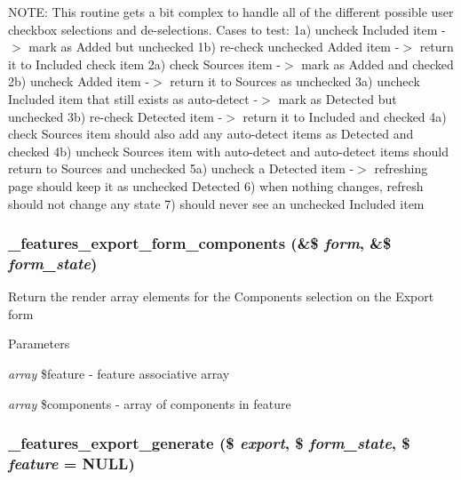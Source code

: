 NOTE: This routine gets a bit complex to handle all of the different possible user checkbox selections and de-\/selections. Cases to test: 1a) uncheck Included item -\/$>$ mark as Added but unchecked 1b) re-\/check unchecked Added item -\/$>$ return it to Included check item 2a) check Sources item -\/$>$ mark as Added and checked 2b) uncheck Added item -\/$>$ return it to Sources as unchecked 3a) uncheck Included item that still exists as auto-\/detect -\/$>$ mark as Detected but unchecked 3b) re-\/check Detected item -\/$>$ return it to Included and checked 4a) check Sources item should also add any auto-\/detect items as Detected and checked 4b) uncheck Sources item with auto-\/detect and auto-\/detect items should return to Sources and unchecked 5a) uncheck a Detected item -\/$>$ refreshing page should keep it as unchecked Detected 6) when nothing changes, refresh should not change any state 7) should never see an unchecked Included item \hypertarget{features_8admin_8inc_a1ac3eccd6829e3c5388179a22bdb9817}{
\subsubsection[{\_\-features\_\-export\_\-form\_\-components}]{\setlength{\rightskip}{0pt plus 5cm}\_\-features\_\-export\_\-form\_\-components (\&\$ {\em form}, \/  \&\$ {\em form\_\-state})}}
\label{features_8admin_8inc_a1ac3eccd6829e3c5388179a22bdb9817}
Return the render array elements for the Components selection on the Export form 
\begin{DoxyParams}{Parameters}
\item[{\em array}]\$feature -\/ feature associative array \item[{\em array}]\$components -\/ array of components in feature \end{DoxyParams}
\hypertarget{features_8admin_8inc_aa105fdb0198373e24dfbe6ae4d096412}{
\subsubsection[{\_\-features\_\-export\_\-generate}]{\setlength{\rightskip}{0pt plus 5cm}\_\-features\_\-export\_\-generate (\$ {\em export}, \/  \$ {\em form\_\-state}, \/  \$ {\em feature} = {\ttfamily NULL})}}
